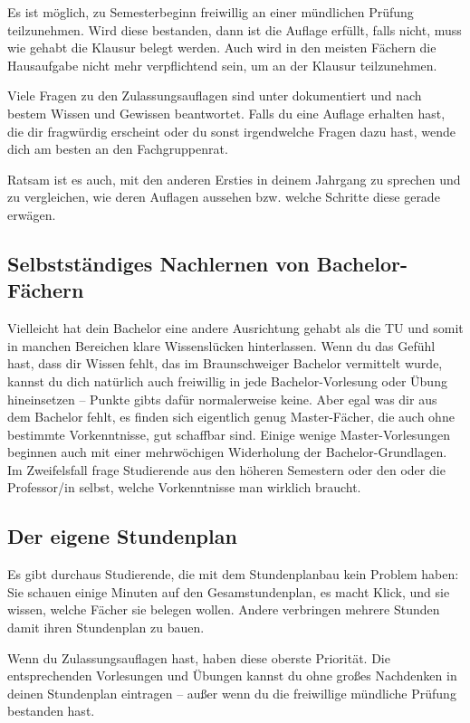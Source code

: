 \begin{multicols}{2}
	Es ist möglich, zu Semesterbeginn freiwillig an einer mündlichen Prüfung teilzunehmen. Wird diese bestanden, dann ist die Auflage erfüllt, falls nicht, muss wie gehabt die Klausur belegt werden. Auch wird in den meisten Fächern die Hausaufgabe nicht mehr verpflichtend sein, um an der Klausur teilzunehmen.

	Viele Fragen zu den Zulassungsauflagen sind unter  dokumentiert und nach bestem Wissen und Gewissen beantwortet. Falls du eine Auflage erhalten hast, die dir fragwürdig erscheint oder du sonst irgendwelche Fragen dazu hast, wende dich am besten an den Fachgruppenrat.

	Ratsam ist es auch, mit den anderen Ersties in deinem Jahrgang zu sprechen und zu vergleichen, wie deren Auflagen aussehen bzw. welche Schritte diese gerade erwägen. 

	\subsection{Selbstständiges Nachlernen von Bachelor-Fächern}
		Vielleicht hat dein Bachelor eine andere Ausrichtung gehabt als die TU und somit in manchen Bereichen klare Wissenslücken hinterlassen. Wenn du das Gefühl hast, dass dir Wissen fehlt, das im Braunschweiger Bachelor vermittelt wurde, kannst du dich natürlich auch freiwillig in jede Bachelor-Vorlesung oder Übung hineinsetzen -- Punkte gibts dafür normalerweise keine. Aber egal was dir aus dem Bachelor fehlt, es finden sich eigentlich genug Master-Fächer, die auch ohne bestimmte Vorkenntnisse, gut schaffbar sind. Einige wenige Master-Vorlesungen beginnen auch mit einer mehrwöchigen Widerholung der Bachelor-Grundlagen. Im Zweifelsfall frage Studierende aus den höheren Semestern oder den oder die Professor/in selbst, welche Vorkenntnisse man wirklich braucht.

	\subsection{Der eigene Stundenplan}
		\label{masterstundenplan}
		Es gibt durchaus Studierende, die mit dem Stundenplanbau kein Problem haben: Sie schauen einige Minuten auf den Gesamstundenplan, es macht Klick, und sie wissen, welche Fächer sie belegen wollen. Andere verbringen mehrere Stunden damit ihren Stundenplan zu bauen.

		Wenn du Zulassungsauflagen hast, haben diese oberste Priorität. Die entsprechenden Vorlesungen und Übungen kannst du ohne großes Nachdenken in deinen Stundenplan eintragen -- außer wenn du die freiwillige mündliche Prüfung bestanden hast.


\end{multicols}
